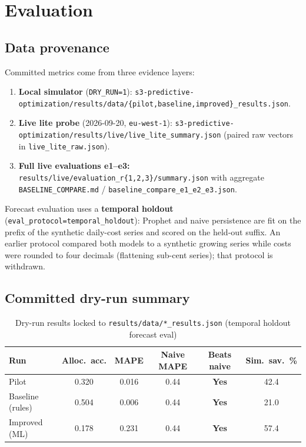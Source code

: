 \chapter{Evaluation}

\section{Data provenance}

Committed metrics come from three evidence layers:

\begin{enumerate}
    \item \textbf{Local simulator} (\texttt{DRY\_RUN=1}):
          \texttt{s3-predictive-optimization/results/data/\{pilot,baseline,improved\}\_results.json}.
    \item \textbf{Live lite probe} (2026-09-20, \texttt{eu-west-1}):
          \texttt{s3-predictive-optimization/results/live/live\_lite\_summary.json}
          (paired raw vectors in \texttt{live\_lite\_raw.json}).
    \item \textbf{Full live evaluations e1--e3:}
          \texttt{results/live/evaluation\_r\{1,2,3\}/summary.json} with aggregate
          \texttt{BASELINE\_COMPARE.md} /
          \texttt{baseline\_compare\_e1\_e2\_e3.json}.
\end{enumerate}

Forecast evaluation uses a \textbf{temporal holdout}
(\texttt{eval\_protocol=temporal\_holdout}): Prophet and naive persistence are fit on the
prefix of the synthetic daily-cost series and scored on the held-out suffix.
An earlier protocol compared both models to a synthetic growing series while costs
were rounded to four decimals (flattening sub-cent series); that protocol is withdrawn.

\section{Committed dry-run summary}

\begin{table}[h]
\centering
\caption{Dry-run results locked to \texttt{results/data/*\_results.json}
(temporal holdout forecast eval)}
\label{tab:varun_dryrun}
\begin{tabular}{lccccc}
\hline
\textbf{Run} & \textbf{Alloc.\ acc.} & \textbf{MAPE} & \textbf{Naive MAPE} & \textbf{Beats naive} & \textbf{Sim.\ sav.\ \%} \\
\hline
Pilot & 0.320 & 0.016 & 0.44 & \textbf{Yes} & 42.4 \\
Baseline (rules) & 0.504 & 0.006 & 0.44 & \textbf{Yes} & 21.0 \\
Improved (ML) & 0.178 & 0.231 & 0.44 & \textbf{Yes} & 57.4 \\
\hline
\end{tabular}
\end{table}

